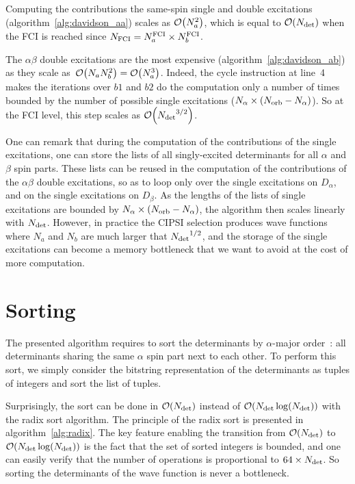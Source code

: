 \documentclass[./thesis.tex]{subfiles}
\begin{document}
Computing the contributions the same-spin single and double excitations
(algorithm~\ref{alg:davidson_aa}) scales as $\order{N_a^2}$, which is equal to
$\order{\Ndet}$ when the FCI is reached since $N_\text{FCI} = N_a^{\text{FCI}} \times
N_b^{\text{FCI}}$.

The $\alpha \beta$ double excitations are the most expensive (algorithm~\ref{alg:davidson_ab})
as they scale as~$\order{N_a  N_b^2} = \order{N_a^3}$. Indeed, the cycle instruction at line~4 makes the
iterations over $b1$ and $b2$ do the computation only a number of times bounded by the number of 
possible single excitations (${N_\alpha} \times \qty({N_\text{orb}} - {N_\alpha})$). So at the FCI level, this step scales as
$\order{\Ndet^{3/2}}$.

One can remark that during the computation of the contributions of the single
excitations, one can store the lists of all singly-excited determinants
for all $\alpha$ and $\beta$ spin parts.
These lists can be reused in the computation of the contributions of the $\alpha \beta$
double excitations, so as to loop only over the single excitations on
$D_\alpha$, and on the single excitations on $D_\beta$. As the lengths of the
lists of single excitations are bounded by ${N_\alpha} \times \qty({N_\text{orb}} - {N_\alpha})$, the
algorithm then scales linearly with ${N_\text{det}}$.  However, in practice the CIPSI
selection produces wave functions where $N_a$ and $N_b$ are much larger
that ${N_\text{det}}^{1/2}$, and the storage of the single excitations can become a
memory bottleneck that we want to avoid at the cost of more computation.

\section{Sorting}

The presented algorithm requires to sort the determinants by $\alpha$-major order~: all determinants
sharing the same $\alpha$ spin part next to each other. To perform this sort, we simply consider the
bitstring representation of the determinants as tuples of integers and sort the list of tuples.

Surprisingly, the sort can be done in $\order{\Ndet}$ instead of $\order{\Ndet \log(\Ndet)}$ with the
radix sort algorithm.\cite{Davis1992Dec}
The principle of the radix sort is presented in algorithm~\ref{alg:radix}.  The
key feature enabling the transition from $\order{\Ndet}$ to $\order{\Ndet
\log(\Ndet)}$ is the fact that the set of sorted integers is bounded, and one
can easily verify that the number of operations is proportional to $64\times
{N_\text{det}}$. So sorting the determinants of the wave function is never a bottleneck.
\end{document}
